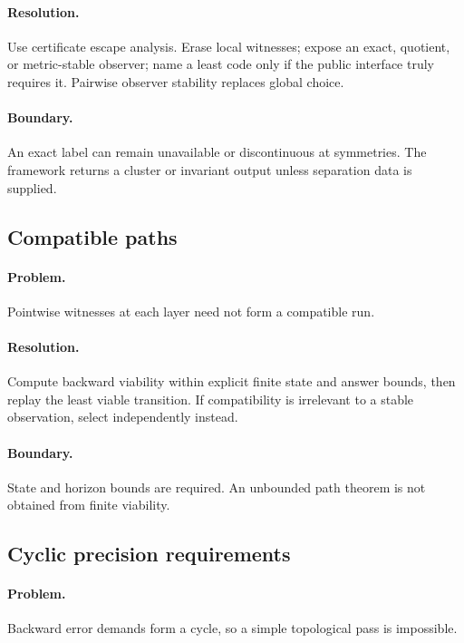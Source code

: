\paragraph{Resolution.}
Use certificate escape analysis.  Erase local witnesses; expose an exact,
quotient, or metric-stable observer; name a least code only if the public
interface truly requires it.  Pairwise observer stability replaces global
choice.

\paragraph{Boundary.}
An exact label can remain unavailable or discontinuous at symmetries.  The
framework returns a cluster or invariant output unless separation data is
supplied.

\subsection{Compatible paths}

\paragraph{Problem.}
Pointwise witnesses at each layer need not form a compatible run.

\paragraph{Resolution.}
Compute backward viability within explicit finite state and answer bounds, then
replay the least viable transition.  If compatibility is irrelevant to a
stable observation, select independently instead.

\paragraph{Boundary.}
State and horizon bounds are required.  An unbounded path theorem is not
obtained from finite viability.

\subsection{Cyclic precision requirements}

\paragraph{Problem.}
Backward error demands form a cycle, so a simple topological pass is
impossible.

